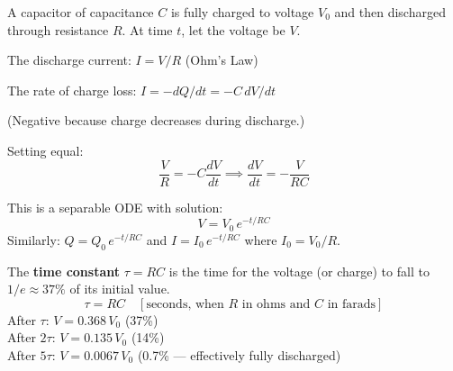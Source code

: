 \begin{processbox}
A capacitor of capacitance $C$ is fully charged to
voltage $V_0$ and then discharged through resistance $R$.
At time $t$, let the voltage be $V$.

The discharge current: $I = V/R$ (Ohm's Law)

The rate of charge loss: $I = -dQ/dt = -C\,dV/dt$

(Negative because charge decreases during discharge.)

Setting equal:
\[
  \frac{V}{R} = -C\frac{dV}{dt}
  \implies \frac{dV}{dt} = -\frac{V}{RC}
\]

This is a separable ODE with solution:
\[
  \boxed{V = V_0\,e^{-t/RC}}
\]
Similarly: $Q = Q_0\,e^{-t/RC}$ and
$I = I_0\,e^{-t/RC}$ where $I_0 = V_0/R$.
\end{processbox}

\begin{definitionbox}
The \textbf{time constant} $\tau = RC$ is the time
for the voltage (or charge) to fall to $1/e
\approx 37\%$ of its initial value.
\[
  \tau = RC \quad [\text{seconds, when }
  R \text{ in ohms and } C \text{ in farads}]
\]
After $\tau$: $V = 0.368\,V_0$ (37\%)\\
After $2\tau$: $V = 0.135\,V_0$ (14\%)\\
After $5\tau$: $V = 0.0067\,V_0$ (0.7\% ---
effectively fully discharged)
\end{definitionbox}

